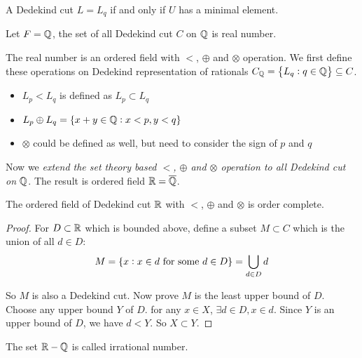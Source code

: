 \begin{theorem}
    A Dedekind cut $L = L_q$  if and only if $U$ has a minimal element.
\end{theorem}


\begin{definition}
    Let $F=\mathbb{Q}$, the set of all Dedekind cut $C$ on $\mathbb{Q}$ is real number.
    
    The real number is an ordered field with $<$, $\oplus$ and $\otimes$ operation. We first define these operations on Dedekind representation of rationals $C_{\mathbb{Q}} = \set{L_q: q \in \mathbb{Q}} \subseteq C$.
    \begin{itemize}
        \item $L_p < L_q$ is defined as $L_p \subset L_q$
        \item $L_p \oplus L_q = \set{x + y \in \mathbb{Q}: x < p, y < q}$
        \item $\otimes$ could be defined as well, but need to consider the sign of $p$ and $q$
    \end{itemize}    
    
    Now we \emph{extend the set theory based $<$, $\oplus$ and $\otimes$ operation to all Dedekind cut on $\mathbb{Q}$}. The result is ordered field $\mathbb{R} = \overline{\mathbb{Q}}$.
\end{definition}



\begin{theorem}\label{dedekind_real_order_complete}
    The ordered field of Dedekind cut $\mathbb{R}$ with $<$, $\oplus$ and $\otimes$  is order complete.    
\end{theorem}
\begin{proof}
    For $D \subset \mathbb{R}$ which is bounded above, define a subset $M \subset C$ which is the union of all $d \in D$:
    \begin{equation}
        M = \set{x: x \in d \text{ for some } d \in D} =\bigcup_{d \in D} d
    \end{equation}
    
    So $M$ is also a Dedekind cut. Now prove $M$ is the least upper bound of $D$. Choose any upper bound $Y$ of $D$. for any $x \in X$, $\exists d \in D,  x \in d$. Since $Y$ is an upper bound of $D$, we have $d < Y$. So $X \subset Y$.
\end{proof}

\begin{definition}
    The set $\mathbb{R} - \mathbb{Q}$ is called irrational number.
\end{definition}

